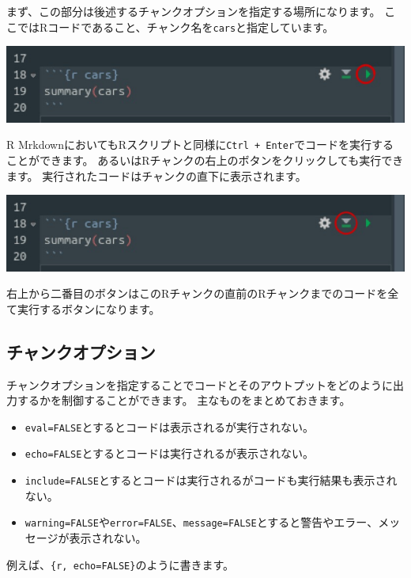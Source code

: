 \documentclass[]{bxjsreport}
\providecommand{\tightlist}{%
  \setlength{\itemsep}{0pt}\setlength{\parskip}{0pt}}
\let\asdf\section
\renewcommand{\section}{\chapter}
\let\asdff\subsection
\renewcommand{\subsection}{\asdf}
\renewcommand{\subsubsection}{\asdff}
\begin{document}
まず、この部分は後述するチャンクオプションを指定する場所になります。
ここではRコードであること、チャンク名を\texttt{cars}と指定しています。

\includegraphics{figures/rmarkdown_html5_2.jpg}

R MrkdownにおいてもRスクリプトと同様に\texttt{Ctrl\ +\ Enter}でコードを実行することができます。
あるいはRチャンクの右上のボタンをクリックしても実行できます。
実行されたコードはチャンクの直下に表示されます。

\includegraphics{figures/rmarkdown_html5_3.jpg}

右上から二番目のボタンはこのRチャンクの直前のRチャンクまでのコードを全て実行するボタンになります。

\hypertarget{ux30c1ux30e3ux30f3ux30afux30aaux30d7ux30b7ux30e7ux30f3}{%
\subsubsection{チャンクオプション}\label{ux30c1ux30e3ux30f3ux30afux30aaux30d7ux30b7ux30e7ux30f3}}

チャンクオプションを指定することでコードとそのアウトプットをどのように出力するかを制御することができます。
主なものをまとめておきます。

\begin{itemize}
\tightlist
\item
  \texttt{eval=FALSE}とするとコードは表示されるが実行されない。
\item
  \texttt{echo=FALSE}とするとコードは実行されるが表示されない。
\item
  \texttt{include=FALSE}とするとコードは実行されるがコードも実行結果も表示されない。
\item
  \texttt{warning=FALSE}や\texttt{error=FALSE}、\texttt{message=FALSE}とすると警告やエラー、メッセージが表示されない。
\end{itemize}

例えば、\texttt{\{r,\ echo=FALSE\}}のように書きます。
\end{document}
